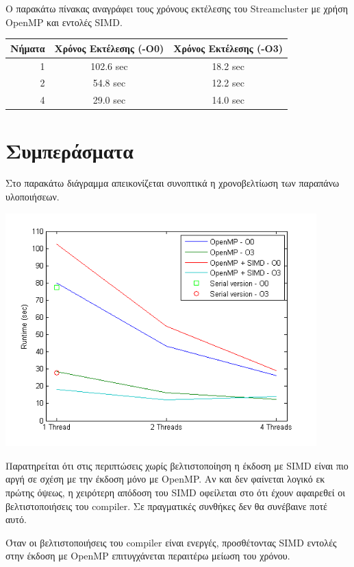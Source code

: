 \documentclass[a4paper,11pt]{article}
\begin{document}
Ο παρακάτω πίνακας αναγράφει τους χρόνους εκτέλεσης του Streamcluster με χρήση OpenMP και εντολές SIMD.

\begin{center}
\begin{tabular}{|r|c|c|}
    \hline
    Νήματα & Χρόνος Εκτέλεσης (-O0) & Χρόνος Εκτέλεσης (-Ο3) \\ \hline
    1 & 102.6 sec & 18.2 sec \\
    2 & 54.8 sec & 12.2 sec \\
    4 & 29.0 sec & 14.0 sec \\ \hline
\end{tabular}
\end{center}
\pagebreak
\section{Συμπεράσματα}
Στο παρακάτω διάγραμμα απεικονίζεται συνοπτικά η χρονοβελτίωση των παραπάνω υλοποιήσεων.
\begin{center}
\includegraphics[width=0.9\textwidth]{../scrshots/results.png}
\end{center} 

Παρατηρείται ότι στις περιπτώσεις χωρίς βελτιστοποίηση η έκδοση με SIMD είναι πιο αργή σε σχέση με την έκδοση μόνο με OpenMP. Αν και δεν φαίνεται λογικό εκ πρώτης όψεως, η χειρότερη απόδοση του SIMD οφείλεται στο ότι έχουν αφαιρεθεί οι βελτιστοποιήσεις του compiler. Σε πραγματικές συνθήκες δεν θα συνέβαινε ποτέ αυτό.

Όταν οι βελτιστοποιήσεις του compiler είναι ενεργές, προσθέτοντας SIMD εντολές στην έκδοση με OpenMP επιτυγχάνεται περαιτέρω μείωση του χρόνου.
\end{document}
